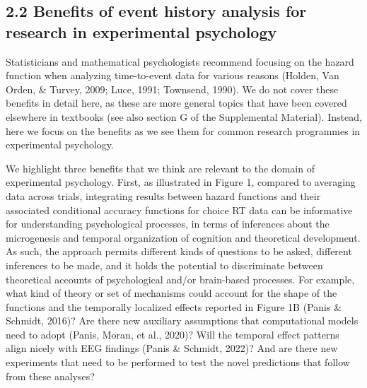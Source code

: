 \documentclass[
  man, donotrepeattitle,floatsintext]{apa6}
\begin{document}
\subsection{2.2 Benefits of event history analysis for research in experimental psychology}\label{benefits-of-event-history-analysis-for-research-in-experimental-psychology}

Statisticians and mathematical psychologists recommend focusing on the hazard function when analyzing time-to-event data for various reasons (Holden, Van Orden, \& Turvey, 2009; Luce, 1991; Townsend, 1990).
We do not cover these benefits in detail here, as these are more general topics that have been covered elsewhere in textbooks (see also section G of the Supplemental Material).
Instead, here we focus on the benefits as we see them for common research programmes in experimental psychology.

We highlight three benefits that we think are relevant to the domain of experimental psychology.
First, as illustrated in Figure 1, compared to averaging data across trials, integrating results between hazard functions and their associated conditional accuracy functions for choice RT data can be informative for understanding psychological processes, in terms of inferences about the microgenesis and temporal organization of cognition and theoretical development.
As such, the approach permits different kinds of questions to be asked, different inferences to be made, and it holds the potential to discriminate between theoretical accounts of psychological and/or brain-based processes.
For example, what kind of theory or set of mechanisms could account for the shape of the functions and the temporally localized effects reported in Figure 1B (Panis \& Schmidt, 2016)?
Are there new auxiliary assumptions that computational models need to adopt (Panis, Moran, et al., 2020)?
Will the temporal effect patterns align nicely with EEG findings (Panis \& Schmidt, 2022)?
And are there new experiments that need to be performed to test the novel predictions that follow from these analyses?
\end{document}
